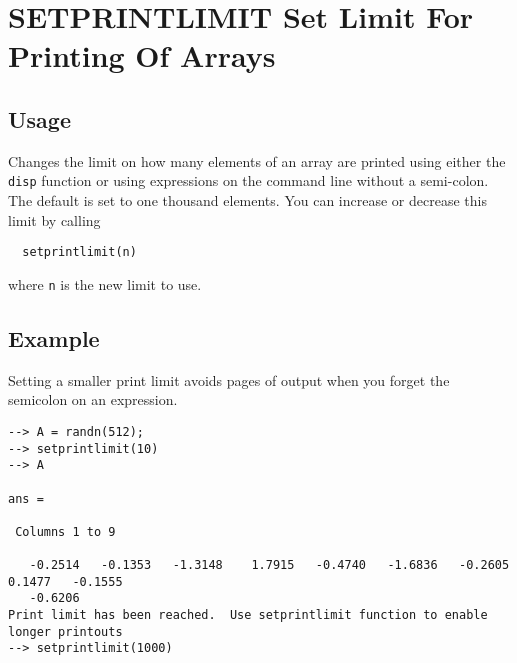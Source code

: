 \section{SETPRINTLIMIT Set Limit For Printing Of Arrays}

\subsection{Usage}

Changes the limit on how many elements of an array are printed
using either the \verb|disp| function or using expressions on the
command line without a semi-colon.  The default is set to 
one thousand elements.  You can increase or decrease this
limit by calling
\begin{verbatim}
  setprintlimit(n)
\end{verbatim}
where \verb|n| is the new limit to use.
\subsection{Example}

Setting a smaller print limit avoids pages of output when you forget the semicolon on an expression.
\begin{verbatim}
--> A = randn(512);
--> setprintlimit(10)
--> A

ans = 

 Columns 1 to 9

   -0.2514   -0.1353   -1.3148    1.7915   -0.4740   -1.6836   -0.2605    0.1477   -0.1555 
   -0.6206
Print limit has been reached.  Use setprintlimit function to enable longer printouts
--> setprintlimit(1000)
\end{verbatim}
